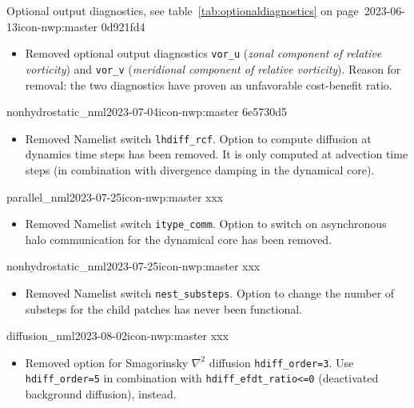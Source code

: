 \begin{changeitem}{Optional output diagnostics, see table~\ref{tab:optionaldiagnostics} on page~\pageref{tab:optionaldiagnostics}}{2023-06-13}{icon-nwp:master 0d921fd4}
  \begin{itemize}
   \item Removed optional output diagnostics \texttt{vor\_u} (\emph{zonal component of relative vorticity}) and \texttt{vor\_v} (\emph{meridional component of relative vorticity}). 
   Reason for removal: the two diagnostics have proven an unfavorable cost-benefit ratio.
  \end{itemize}
\end{changeitem}

\begin{changeitem}{nonhydrostatic\_nml}{2023-07-04}{icon-nwp:master 6e5730d5}
  \begin{itemize}
   \item Removed Namelist switch \texttt{lhdiff\_rcf}. Option to compute diffusion at dynamics time steps has been removed. It is only computed at advection time steps (in combination with divergence damping in the dynamical core).
  \end{itemize}
\end{changeitem}

\begin{changeitem}{parallel\_nml}{2023-07-25}{icon-nwp:master xxx}
  \begin{itemize}
   \item Removed Namelist switch \texttt{itype\_comm}. Option to switch on asynchronous halo communication for the dynamical core has been removed.
  \end{itemize}
\end{changeitem}

\begin{changeitem}{nonhydrostatic\_nml}{2023-07-25}{icon-nwp:master xxx}
  \begin{itemize}
   \item Removed Namelist switch \texttt{nest\_substeps}. Option to change the number of substeps for the child patches has never been functional.
  \end{itemize}
\end{changeitem}

\begin{changeitem}{diffusion\_nml}{2023-08-02}{icon-nwp:master xxx}
  \begin{itemize}
   \item Removed option for Smagorinsky $\nabla^{2}$ diffusion \texttt{hdiff\_order=3}. Use \texttt{hdiff\_order=5} in combination with \texttt{hdiff\_efdt\_ratio<=0} (deactivated background diffusion), instead.
  \end{itemize}
\end{changeitem}
